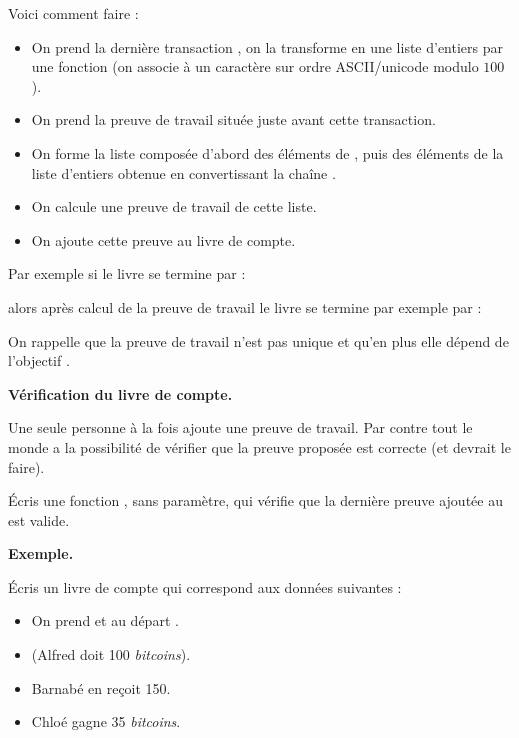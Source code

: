 \documentclass[12pt,class=report,crop=false]{standalone}
\begin{document}
\begin{enumerate}
Voici comment faire :
  \begin{itemize}
    \item On prend la dernière transaction , on la transforme en une liste d'entiers par une fonction  (on associe à un caractère sur ordre ASCII/unicode modulo $100$).
    \item On prend la preuve de travail  située juste avant cette transaction.
    \item On forme la liste  composée d'abord des éléments de , puis des éléments de la liste d'entiers obtenue en convertissant la chaîne .
    \item On calcule une preuve de travail de cette liste.
    \item  On ajoute cette preuve au livre de compte.
  \end{itemize}
  Par exemple si le livre se termine par :\\
  \centerline{}
  alors après calcul de la preuve de travail le livre se termine par exemple par :\\
  \centerline{}  
     On rappelle que la preuve de travail n'est pas unique et qu'en plus elle dépend 
   de l'objectif .
   
 \newpage

 \textbf{Vérification du livre de compte.}  
   
Une seule personne à la fois ajoute une preuve de travail. Par contre tout le monde a la possibilité de vérifier que la preuve proposée est correcte (et devrait le faire). 


	Écris une fonction , sans paramètre, qui vérifie que la dernière preuve ajoutée au  est valide.
	
	
	\bigskip
	

\textbf{Exemple.}

Écris un livre de compte qui correspond aux données suivantes :
	\begin{itemize}
	  \item On prend  et au départ .
	  \item {} (Alfred doit 100 \emph{bitcoins}).
	  \item Barnabé en reçoit 150.
	  \item Chloé gagne 35 \emph{bitcoins}.
	\end{itemize}

\end{enumerate} 
\end{document}
